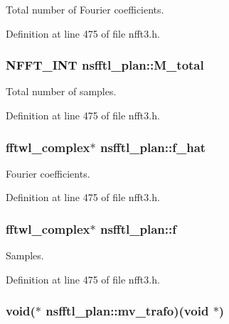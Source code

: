 Total number of Fourier coefficients. 



Definition at line 475 of file nfft3.\-h.

\hypertarget{structnsfftl__plan_a60e803e00ea49d6edecfc8631afcbd4c}{
\subsubsection[{M\-\_\-total}]{\setlength{\rightskip}{0pt plus 5cm}N\-F\-F\-T\-\_\-\-I\-N\-T nsfftl\-\_\-plan\-::\-M\-\_\-total}}\label{structnsfftl__plan_a60e803e00ea49d6edecfc8631afcbd4c}


Total number of samples. 



Definition at line 475 of file nfft3.\-h.

\hypertarget{structnsfftl__plan_a93d9d361d56e03f44bc6a9d4265b9f43}{
\subsubsection[{f\-\_\-hat}]{\setlength{\rightskip}{0pt plus 5cm}fftwl\-\_\-complex$\ast$ nsfftl\-\_\-plan\-::f\-\_\-hat}}\label{structnsfftl__plan_a93d9d361d56e03f44bc6a9d4265b9f43}


Fourier coefficients. 



Definition at line 475 of file nfft3.\-h.

\hypertarget{structnsfftl__plan_ada472d5a0fb2afc32b4d1683c98185f6}{
\subsubsection[{f}]{\setlength{\rightskip}{0pt plus 5cm}fftwl\-\_\-complex$\ast$ nsfftl\-\_\-plan\-::f}}\label{structnsfftl__plan_ada472d5a0fb2afc32b4d1683c98185f6}


Samples. 



Definition at line 475 of file nfft3.\-h.

\hypertarget{structnsfftl__plan_aad46757ac44a32dbb04d0e453454acac}{
\subsubsection[{mv\-\_\-trafo}]{\setlength{\rightskip}{0pt plus 5cm}void($\ast$ nsfftl\-\_\-plan\-::mv\-\_\-trafo)(void $\ast$)}}\label{structnsfftl__plan_aad46757ac44a32dbb04d0e453454acac}


